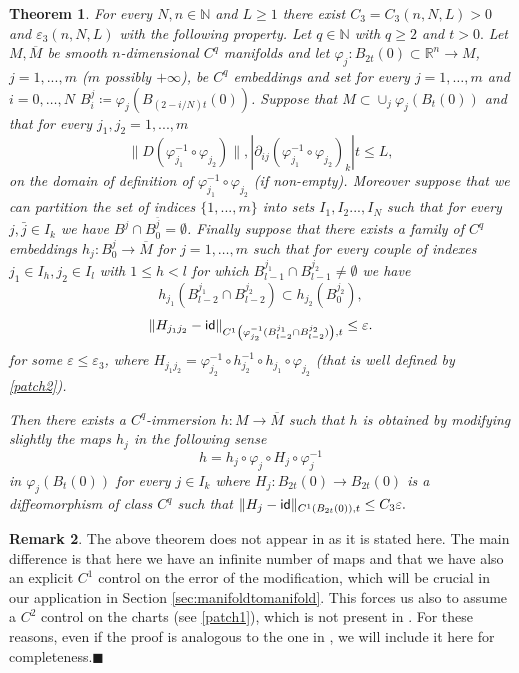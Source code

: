\documentclass[11pt]{article}
\newcommand{\eps}{\varepsilon}
\newcommand{\rr}{\mathbb{R}}
\renewcommand{\phi}{\varphi}
\newcommand{\fr}{\penalty-20\null\hfill$\blacksquare$}
\theoremstyle{plain}
\newtheorem{theorem}{Theorem}[section]
\theoremstyle{definition}
\newtheorem{remark}[theorem]{Remark}
\numberwithin{equation}{section}
\begin{document}
\begin{theorem}\label{patching}
	For every $N,n \in \mathbb{N}$ and $L\ge 1$ there exist $C_3=C_3(n,N,L)>0$ and $\eps_3(n,N,L)$ with the following property. Let $q \in \mathbb{N}$ with $q \ge 2$ and $t>0.$ Let $M,{\overline M}$ be smooth $n$-dimensional $C^q$ manifolds and let $\phi_j: B_{2t}(0)\subset \rr^n \to M$, $j=1,...,m$ ($m$ possibly $+\infty$), be $C^q$ embeddings and set for every $j=1,\ldots,m$ and $i=0,\dots,N$  $B_i^j\coloneqq \phi_j(B_{(2-i/{N})t}(0))$. Suppose that $M \subset \cup_j \phi_j(B_{t}(0))$ and that  for  every $j_1, j_2=1,...,m$
	\begin{equation}\label{patch1}
		\|D(\phi_{j_1}^{-1}\circ\phi_{j_2})\|,|\partial_{ij}(\phi_{j_1}^{-1}\circ\phi_{j_2})_k|t\le 
		L,
	\end{equation}
	on  the domain of definition of $\phi_{j_1}^{-1}\circ\phi_{j_2}$ (if non-empty). Moreover suppose that we can partition the set of indices $\{1,...,m\}$ into sets $I_1,I_2...,I_{N}$ such that for every $j,\bar j\in I_k$ we have $B^j \cap B^{\bar j}_0 = \emptyset$. Finally suppose that there exists a family of $C^q$ embeddings $h_j: B_0^j \to {\overline M}$ for $j=1,\dots,m$ such that for every couple of indexes $j_1 \in I_h,j_2 \in I_l$  with $1\le  h<l$ for which $B_{l-1}^{j_1} \cap B_{l-1}^{j_2}\neq \emptyset$  we have
	\begin{equation}\label{patch2}
		h_{j_1}(B_{l-2}^{j_1} \cap B_{l-2}^{j_2})\subset h_{j_2}(B_0^{j_2}),
	\end{equation}
	\begin{equation}\label{patch3}
		\| H_{j_1j_2}-{\sf{id}}\|_{C^1\left (\phi_{j_2}^{-1}(B_{l-2}^{j_1} \cap B_{l-2}^{j_2})\right ),t}\le \eps.
	\end{equation}
	for some $\eps \le \eps_3$, where $H_{j_1j_2}=\phi_{j_2}^{-1}\circ h_{j_2}^{-1}\circ h_{j_1}\circ \phi_{j_2}$ (that is well defined by \eqref{patch2}). 
	
	Then there exists a $C^q$-immersion  $h : M \to {\overline M}$ such that $h$ is obtained by modifying slightly the maps $h_j$ in the following sense
	\begin{equation}\label{g}
		h=h_j \circ \phi_j \circ H_j \circ \phi_j^{-1}
	\end{equation}
	in $\phi_j(B_{t}(0))$ for every $j \in I_k$ where $H_j: B_{2t}(0) \to B_{2t}(0)$ is a diffeomorphism of class $C^q$ such that $\|H_j-{\sf{id}}\|_{C^1(B_{2t}(0)),t}\le C_3\eps.$
\end{theorem}
\begin{remark}
	The above theorem does not appear in \cite{Cheeger} as it is stated here. The main difference is that here we have an infinite number of maps and that we have also an explicit $C^1$ control on the error of the modification, which will be crucial in our application in Section \ref{sec:manifoldtomanifold}. This forces us  also  to assume a $C^2$ control on the charts (see \eqref{patch1}), which is not present in \cite{Cheeger}. 
	For these reasons, even if the proof is analogous to the one in \cite{Cheeger}, we will include it here for completeness.\fr
\end{remark}
\end{document}
